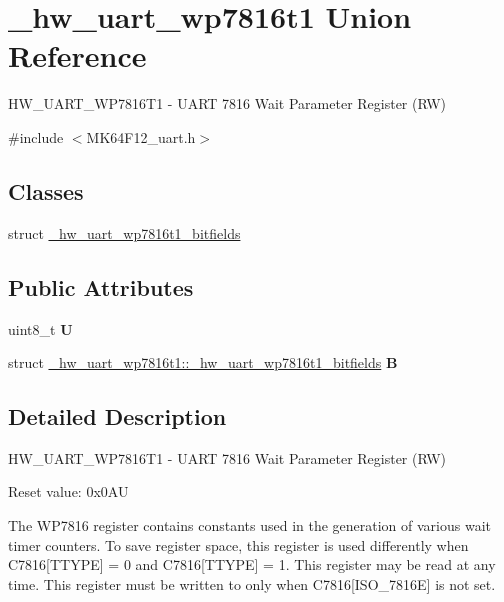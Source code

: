 \hypertarget{union__hw__uart__wp7816t1}{}\section{\+\_\+hw\+\_\+uart\+\_\+wp7816t1 Union Reference}
\label{union__hw__uart__wp7816t1}


H\+W\+\_\+\+U\+A\+R\+T\+\_\+\+W\+P7816\+T1 -\/ U\+A\+RT 7816 Wait Parameter Register (RW)  




{\ttfamily \#include $<$M\+K64\+F12\+\_\+uart.\+h$>$}

\subsection*{Classes}
\begin{DoxyCompactItemize}
\item 
struct \hyperlink{struct__hw__uart__wp7816t1_1_1__hw__uart__wp7816t1__bitfields}{\+\_\+hw\+\_\+uart\+\_\+wp7816t1\+\_\+bitfields}
\end{DoxyCompactItemize}
\subsection*{Public Attributes}
\begin{DoxyCompactItemize}
\item 
uint8\+\_\+t {\bfseries U}\hypertarget{union__hw__uart__wp7816t1_a4fbe37c45f37869b60cd41f5759c4f96}{}\label{union__hw__uart__wp7816t1_a4fbe37c45f37869b60cd41f5759c4f96}

\item 
struct \hyperlink{struct__hw__uart__wp7816t1_1_1__hw__uart__wp7816t1__bitfields}{\+\_\+hw\+\_\+uart\+\_\+wp7816t1\+::\+\_\+hw\+\_\+uart\+\_\+wp7816t1\+\_\+bitfields} {\bfseries B}\hypertarget{union__hw__uart__wp7816t1_ae709aa281983ac661f24ac8b62c0e263}{}\label{union__hw__uart__wp7816t1_ae709aa281983ac661f24ac8b62c0e263}

\end{DoxyCompactItemize}


\subsection{Detailed Description}
H\+W\+\_\+\+U\+A\+R\+T\+\_\+\+W\+P7816\+T1 -\/ U\+A\+RT 7816 Wait Parameter Register (RW) 

Reset value\+: 0x0\+AU

The W\+P7816 register contains constants used in the generation of various wait timer counters. To save register space, this register is used differently when C7816\mbox{[}T\+T\+Y\+PE\mbox{]} = 0 and C7816\mbox{[}T\+T\+Y\+PE\mbox{]} = 1. This register may be read at any time. This register must be written to only when C7816\mbox{[}I\+S\+O\+\_\+7816E\mbox{]} is not set. 

